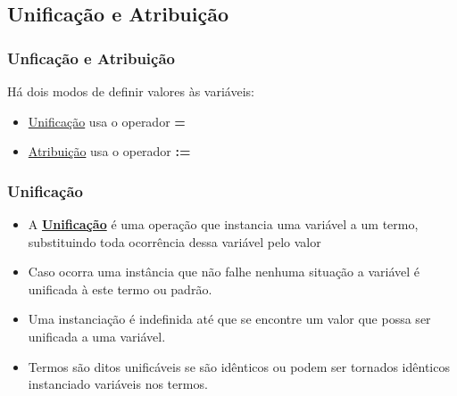 
\subsection{Unificação e Atribuição}

\begin{frame} [fragile]
	\frametitle{Unficação e Atribuição}
	Há dois modos de definir valores às variáveis:
	
	\pause
	\begin{itemize}
	  \item \underline{Unificação} usa o operador 	\textbf{=}
	
		  \item \underline{Atribuição} usa o operador \textbf{:=}

	\end{itemize}
\end{frame}


\begin{frame}[fragile]
	\frametitle{Unificação}
	\begin{itemize}
		
		\item A \textbf{\underline{Unificação}} é uma operação que instancia uma variável a um termo, substituindo toda  ocorrência dessa variável pelo valor
		
		
		\pause
		\item Caso ocorra uma instância que não falhe nenhuma situação a variável é unificada à este termo
		ou padrão.
		
		\pause
		\item Uma instanciação é indefinida até que se encontre um valor que possa ser unificada a uma
		variável.
        
   		\pause
     \item Termos são ditos unificáveis se são idênticos ou podem ser tornados idênticos instanciado 
        variáveis nos termos.
		
	\end{itemize}
	
\end{frame}

